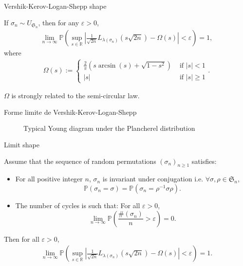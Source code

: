 \documentclass[english,xcolor=table]{beamer}
\begin{document}
\begin{frame}{Vershik-Kerov-Logan-Shepp shape}
    \begin{theorem}
    If $\sigma_n \sim U_{\mathfrak{S}_n}$, then for any $\varepsilon>0$,
\begin{align*}
\lim_{n\to \infty} \mathbb{P}\left(\sup_{s\in \mathbb{R}} \left|\frac{1}{\sqrt{2n}}L_{\lambda(\sigma_n)}\left({s}{\sqrt{2n}}\right)-\Omega(s)\right|<\varepsilon\right) =1,
\end{align*}
where
\begin{align*}
\Omega(s):=\begin{cases}
\frac{2}{\pi}(s\arcsin({s})+\sqrt{1-s^2}) & \text{ if } |s|<1 \\ 
|s| & \text{ if } |s|\geq 1 
\end{cases}.
\end{align*}
    \end{theorem}
    \vspace{10 mm}

     $\Omega$ is strongly related to the semi-circular law.
\end{frame}
\begin{frame}{Forme limite de Vershik-Kerov-Logan-Shepp}
    \begin{figure}[ht]
    \centering
     \def\svgscale{.65}
    
       

    \caption{Typical Young diagram under the Plancherel distribution}
\end{figure}

\end{frame}


 \begin{frame}{Limit shape}
    \begin{theorem}[\cite{sk}]
Assume that the sequence of random permutations  $(\sigma_n)_{n\geq 1}$ satisfies:
\begin{itemize}
\item  For all positive integer $n$, $\sigma_n$ is invariant under conjugation i.e.  $\forall \sigma , \rho \in \mathfrak{S}_n$,
\begin{equation}\tag{H1}
\mathbb{P}(\sigma_n=\sigma)=\mathbb{P}(\sigma_n=\rho^{-1}\sigma\rho).
\end{equation}
\item The number of cycles is such that: For all $\varepsilon>0$,
\begin{equation}\tag{H3}
\lim_{n\to \infty}\mathbb{P}\left(\frac{\#(\sigma_n)}{n}>\varepsilon\right) =0.
\end{equation}
\end{itemize}
Then  for all  $\varepsilon>0$,
\begin{align*}
\lim_{n\to \infty} \mathbb{P}\left(\sup_{s\in \mathbb{R}} \left|\frac{1}{\sqrt{2n}}L_{\lambda(\sigma_n)}\left({s}{\sqrt{2n}}\right)-\Omega(s)\right|<\varepsilon\right) =1.
\end{align*}
\end{theorem}
\end{frame}
\end{document}
